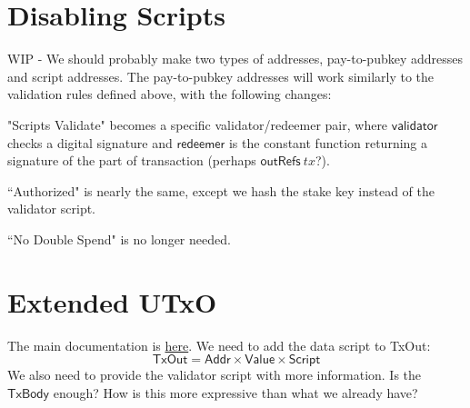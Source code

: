 \documentclass[11pt,a4paper]{article}
\newcommand{\var}[1]{\mathit{#1}}
\newcommand{\fun}[1]{\mathsf{#1}}
\newcommand{\type}[1]{\mathsf{#1}}
\newcommand{\Script}{\type{Script}}
\newcommand{\Addr}{\type{Addr}}
\newcommand{\Value}{\type{Value}}
\newcommand{\TxOut}{\type{TxOut}}
\newcommand{\TxBody}{\type{TxBody}}
\newcommand{\outRefs}[1]{\fun{outRefs}\ \var{#1}}
\begin{document}

\section{Disabling Scripts}

WIP - We should probably make two types of addresses, pay-to-pubkey addresses and script addresses.
The pay-to-pubkey addresses will work similarly to the validation rules defined above, with the
following changes:

"Scripts Validate" becomes a specific validator/redeemer pair, where $\mathsf{validator}$ checks a
digital signature and $\mathsf{redeemer}$ is the constant function returning a signature of the
part of transaction (perhaps $\outRefs tx$?).

``Authorized" is nearly the same, except we hash the stake key instead of the validator script.

``No Double Spend" is no longer needed.

\section{Extended UTxO}

The main documentation is \href{https://github.com/input-output-hk/plutus/tree/master/docs/extended-utxo}{here}.
We need to add the data script to TxOut:
$$ \TxOut = \Addr \times \Value \times \Script $$
We also need to provide the validator script with more information.  Is the $\TxBody$ enough?
How is this more expressive than what we already have?



\end{document}
